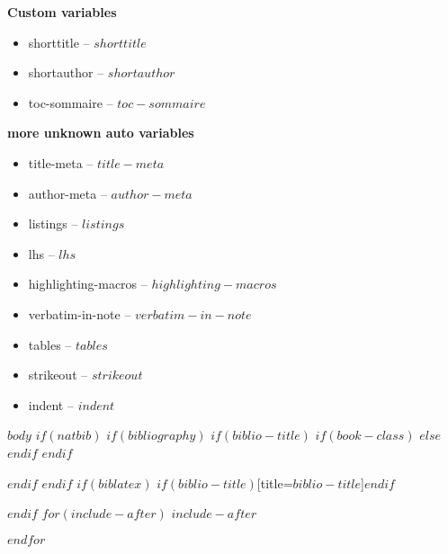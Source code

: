 \documentclass[$if(fontsize)$$fontsize$,$endif$$if(lang)$$babel-lang$,$endif$$if(papersize)$$papersize$paper,$endif$$for(classoption)$$classoption$$sep$,$endfor$]{$documentclass$}
\begin{document}
{\textbf{Custom variables}

\begin{itemize}
        \item shorttitle -- $shorttitle$
        \item shortauthor -- $shortauthor$
        \item toc-sommaire -- $toc-sommaire$
\end{itemize}


\textbf{more unknown auto variables}

\begin{itemize}
        \item title-meta -- $title-meta$
        \item author-meta -- $author-meta$
        \item listings -- $listings$
        \item lhs -- $lhs$
        \item highlighting-macros -- $highlighting-macros$
        \item verbatim-in-note -- $verbatim-in-note$
        \item tables -- $tables$
        \item strikeout -- $strikeout$
        \item indent -- $indent$
\end{itemize}


} %
{} %



$body$
$if(natbib)$
$if(bibliography)$
$if(biblio-title)$
$if(book-class)$
\renewcommand\bibname{$biblio-title$}
$else$
\renewcommand\refname{$biblio-title$}
$endif$
$endif$


$endif$
$endif$
$if(biblatex)$
\printbibliography$if(biblio-title)$[title=$biblio-title$]$endif$

$endif$
$for(include-after)$
$include-after$

$endfor$
\end{document}
